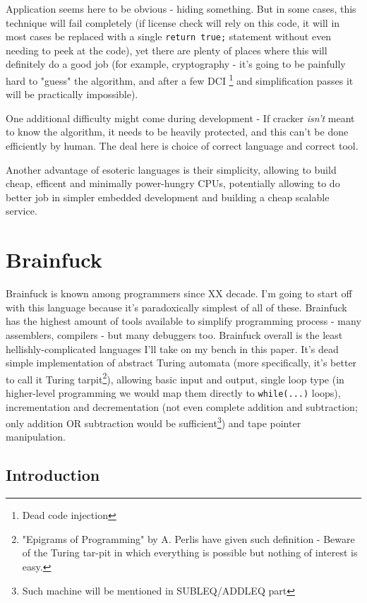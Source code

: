 \documentclass{article}
\begin{document}
\par Application seems here to be obvious - hiding something. But in some cases, this technique will fail completely (if license check will rely on this code, it will in most cases be replaced with a single \verb|return true;| statement without even needing to peek at the code), yet there are plenty of places where this will definitely do a good job (for example, cryptography - it's going to be painfully hard to "guess" the algorithm, and after a few DCI \footnote{Dead code injection} and simplification passes it will be practically impossible).

\par One additional difficulty might come during development - If cracker {\it isn't} meant to know the algorithm, it needs to be heavily protected, and this can't be done efficiently by human. The deal here is choice of correct language and correct tool.

\par Another advantage of esoteric languages is their simplicity, allowing to build cheap, efficent and minimally power-hungry CPUs, potentially allowing to do better job in simpler embedded development and building a cheap scalable service.

\section{Brainfuck}
\par Brainfuck is known among programmers since XX decade. I'm going to start off with this language because it's paradoxically simplest of all of these. Brainfuck has the highest amount of tools available to simplify programming process - many assemblers, compilers - but many debuggers too. Brainfuck overall is the least hellishly-complicated languages I'll take on my bench in this paper. It's dead simple implementation of abstract Turing automata (more specifically, it's better to call it Turing tarpit\footnote{"Epigrams of Programming" by A. Perlis have given such definition - {Beware of the Turing tar-pit in which everything is possible but nothing of interest is easy.}}), allowing basic input and output, single loop type (in higher-level programming we would map them directly to \verb|while(...)| loops), incrementation and decrementation (not even complete addition and subtraction; only addition OR subtraction would be sufficient\footnote{Such machine will be mentioned in SUBLEQ/ADDLEQ part}) and tape pointer manipulation.

\subsection{Introduction}
\end{document}
